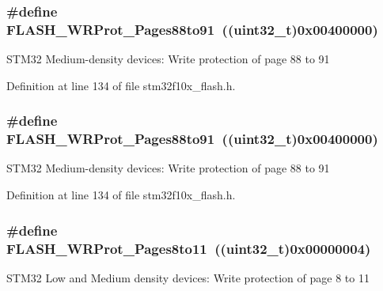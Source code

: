 \subsubsection[{\texorpdfstring{F\+L\+A\+S\+H\+\_\+\+W\+R\+Prot\+\_\+\+Pages88to91}{FLASH_WRProt_Pages88to91}}]{\setlength{\rightskip}{0pt plus 5cm}\#define F\+L\+A\+S\+H\+\_\+\+W\+R\+Prot\+\_\+\+Pages88to91~(({\bf uint32\+\_\+t})0x00400000)}\hypertarget{group___option___bytes___write___protection_gaeece6aa5e198239067c47f678b9d015e}{}\label{group___option___bytes___write___protection_gaeece6aa5e198239067c47f678b9d015e}
S\+T\+M32 Medium-\/density devices\+: Write protection of page 88 to 91 

Definition at line 134 of file stm32f10x\+\_\+flash.\+h.

\subsubsection[{\texorpdfstring{F\+L\+A\+S\+H\+\_\+\+W\+R\+Prot\+\_\+\+Pages88to91}{FLASH_WRProt_Pages88to91}}]{\setlength{\rightskip}{0pt plus 5cm}\#define F\+L\+A\+S\+H\+\_\+\+W\+R\+Prot\+\_\+\+Pages88to91~(({\bf uint32\+\_\+t})0x00400000)}\hypertarget{group___option___bytes___write___protection_gaeece6aa5e198239067c47f678b9d015e}{}\label{group___option___bytes___write___protection_gaeece6aa5e198239067c47f678b9d015e}
S\+T\+M32 Medium-\/density devices\+: Write protection of page 88 to 91 

Definition at line 134 of file stm32f10x\+\_\+flash.\+h.

\subsubsection[{\texorpdfstring{F\+L\+A\+S\+H\+\_\+\+W\+R\+Prot\+\_\+\+Pages8to11}{FLASH_WRProt_Pages8to11}}]{\setlength{\rightskip}{0pt plus 5cm}\#define F\+L\+A\+S\+H\+\_\+\+W\+R\+Prot\+\_\+\+Pages8to11~(({\bf uint32\+\_\+t})0x00000004)}\hypertarget{group___option___bytes___write___protection_ga7eca7a8b11accdd6dadf3445847e1a57}{}\label{group___option___bytes___write___protection_ga7eca7a8b11accdd6dadf3445847e1a57}
S\+T\+M32 Low and Medium density devices\+: Write protection of page 8 to 11 

